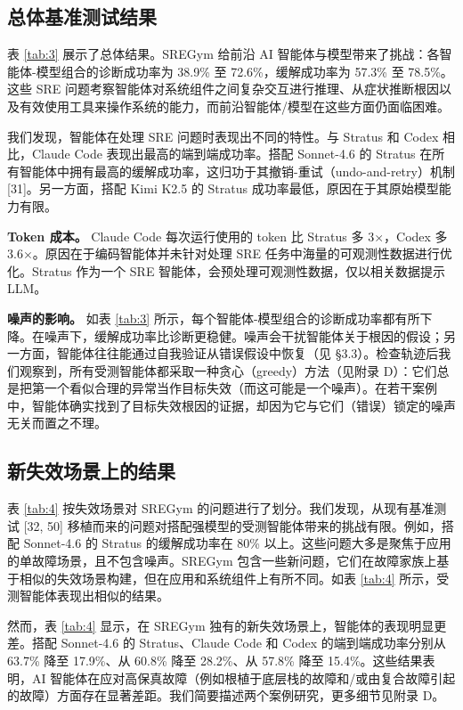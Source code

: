 \documentclass[11pt,UTF8,fontset=fandol]{ctexart}
\begin{document}
\subsection{总体基准测试结果}

表 \ref{tab:3} 展示了总体结果。SREGym 给前沿 AI 智能体与模型带来了挑战：各智能体-模型组合的诊断成功率为 38.9\% 至 72.6\%，缓解成功率为 57.3\% 至 78.5\%。这些 SRE 问题考察智能体对系统组件之间复杂交互进行推理、从症状推断根因以及有效使用工具来操作系统的能力，而前沿智能体/模型在这些方面仍面临困难。

我们发现，智能体在处理 SRE 问题时表现出不同的特性。与 Stratus 和 Codex 相比，Claude Code 表现出最高的端到端成功率。搭配 Sonnet-4.6 的 Stratus 在所有智能体中拥有最高的缓解成功率，这归功于其撤销-重试（undo-and-retry）机制 [31]。另一方面，搭配 Kimi K2.5 的 Stratus 成功率最低，原因在于其原始模型能力有限。

\textbf{Token 成本。} Claude Code 每次运行使用的 token 比 Stratus 多 3$\times$，Codex 多 3.6$\times$。原因在于编码智能体并未针对处理 SRE 任务中海量的可观测性数据进行优化。Stratus 作为一个 SRE 智能体，会预处理可观测性数据，仅以相关数据提示 LLM。

\textbf{噪声的影响。} 如表 \ref{tab:3} 所示，每个智能体-模型组合的诊断成功率都有所下降。在噪声下，缓解成功率比诊断更稳健。噪声会干扰智能体关于根因的假设；另一方面，智能体往往能通过自我验证从错误假设中恢复（见 §3.3）。检查轨迹后我们观察到，所有受测智能体都采取一种贪心（greedy）方法（见附录 D）：它们总是把第一个看似合理的异常当作目标失效（而这可能是一个噪声）。在若干案例中，智能体确实找到了目标失效根因的证据，却因为它与它们（错误）锁定的噪声无关而置之不理。

\subsection{新失效场景上的结果}

表 \ref{tab:4} 按失效场景对 SREGym 的问题进行了划分。我们发现，从现有基准测试 [32, 50] 移植而来的问题对搭配强模型的受测智能体带来的挑战有限。例如，搭配 Sonnet-4.6 的 Stratus 的缓解成功率在 80\% 以上。这些问题大多是聚焦于应用的单故障场景，且不包含噪声。SREGym 包含一些新问题，它们在故障家族上基于相似的失效场景构建，但在应用和系统组件上有所不同。如表 \ref{tab:4} 所示，受测智能体表现出相似的结果。

然而，表 \ref{tab:4} 显示，在 SREGym 独有的新失效场景上，智能体的表现明显更差。搭配 Sonnet-4.6 的 Stratus、Claude Code 和 Codex 的端到端成功率分别从 63.7\% 降至 17.9\%、从 60.8\% 降至 28.2\%、从 57.8\% 降至 15.4\%。这些结果表明，AI 智能体在应对高保真故障（例如根植于底层栈的故障和/或由复合故障引起的故障）方面存在显著差距。我们简要描述两个案例研究，更多细节见附录 D。
\end{document}
